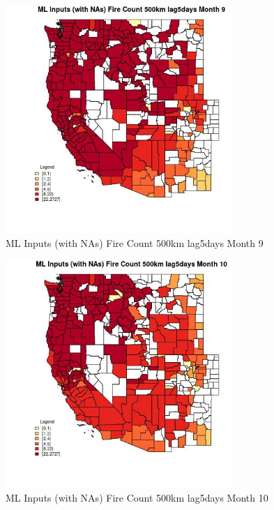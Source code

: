 \begin{figure} 
\centering  
\includegraphics[width=0.77\textwidth]{Code_Outputs/Report_ML_input_PM25_Step4_part_f_de_duplicated_aveswNAs_CountyFire_Count_500km_lag5daysmedianMonth9.jpg} 
\caption{\label{fig:Report_ML_input_PM25_Step4_part_f_de_duplicated_aveswNAsCountyFire_Count_500km_lag5daysmedianMonth9}ML Inputs (with NAs) Fire Count 500km lag5days Month 9} 
\end{figure} 
 

\begin{figure} 
\centering  
\includegraphics[width=0.77\textwidth]{Code_Outputs/Report_ML_input_PM25_Step4_part_f_de_duplicated_aveswNAs_CountyFire_Count_500km_lag5daysmedianMonth10.jpg} 
\caption{\label{fig:Report_ML_input_PM25_Step4_part_f_de_duplicated_aveswNAsCountyFire_Count_500km_lag5daysmedianMonth10}ML Inputs (with NAs) Fire Count 500km lag5days Month 10} 
\end{figure} 
 

